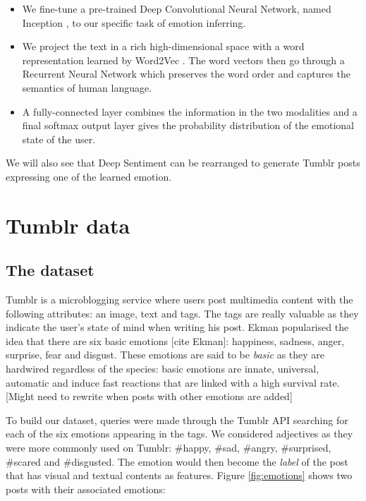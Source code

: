 \documentclass{article} %
\begin{document}
\begin{itemize}
    \item We fine-tune a pre-trained Deep Convolutional Neural Network, named Inception \citep{Szegedy-15}, to our specific task of emotion inferring.
    \item We project the text in a rich high-dimensional space with a word representation learned by Word2Vec \citep{Mikolov-13}. The word vectors then go through a Recurrent Neural Network which preserves the word order and captures the semantics of human language.
    \item A fully-connected layer combines the information in the two modalities and a final softmax output layer gives the probability distribution of the emotional state of the user.
\end{itemize}

We will also see that Deep Sentiment can be rearranged to generate Tumblr posts expressing one of the learned emotion.

\section{Tumblr data}

\subsection{The dataset}
Tumblr is a microblogging service where users post multimedia content with the following attributes: an image, text and tags. The tags are really valuable as they indicate the user's state of mind when writing his post. Ekman popularised the idea that there are six basic emotions [cite Ekman]: happiness, sadness, anger, surprise, fear and disgust. These emotions are said to be {\em basic} as they are hardwired regardless of the species: basic emotions are innate, universal, automatic and induce fast reactions that are linked with a high survival rate. [Might need to rewrite when posts with other emotions are added]

To build our dataset, queries were made through the Tumblr API searching for each of the six emotions appearing in the tags. We considered adjectives as they were more commonly used on Tumblr: \#happy, \#sad, \#angry, \#surprised, \#scared and \#disgusted. The emotion would then become the {\em label} of the post that has visual and textual contents as features. Figure \ref{fig:emotions} shows two posts with their associated emotions:
\end{document}

